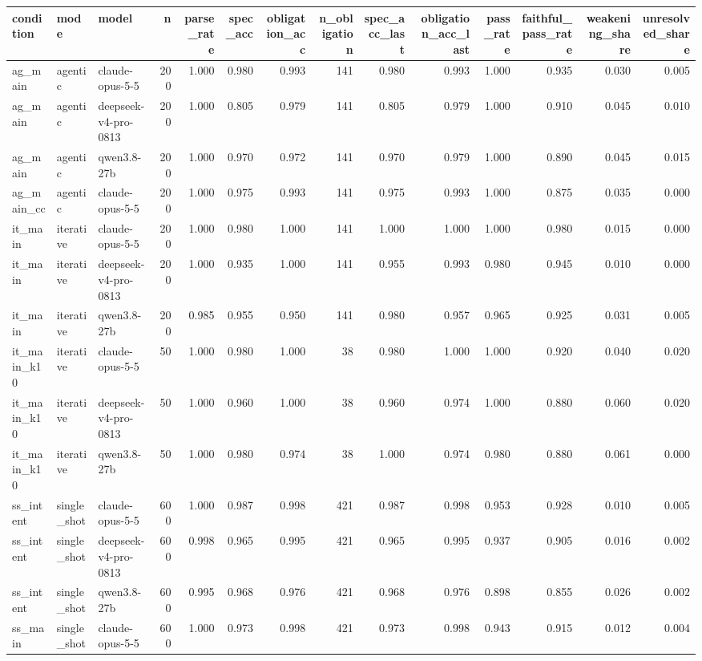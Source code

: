 \begin{tabular}{lllrrrrrrrrrrr}
\toprule
condition & mode & model & n & parse\_rate & spec\_acc & obligation\_acc & n\_obligation & spec\_acc\_last & obligation\_acc\_last & pass\_rate & faithful\_pass\_rate & weakening\_share & unresolved\_share \\
\midrule
ag\_main & agentic & claude-opus-5-5 & 200 & 1.000 & 0.980 & 0.993 & 141 & 0.980 & 0.993 & 1.000 & 0.935 & 0.030 & 0.005 \\
ag\_main & agentic & deepseek-v4-pro-0813 & 200 & 1.000 & 0.805 & 0.979 & 141 & 0.805 & 0.979 & 1.000 & 0.910 & 0.045 & 0.010 \\
ag\_main & agentic & qwen3.8-27b & 200 & 1.000 & 0.970 & 0.972 & 141 & 0.970 & 0.979 & 1.000 & 0.890 & 0.045 & 0.015 \\
ag\_main\_cc & agentic & claude-opus-5-5 & 200 & 1.000 & 0.975 & 0.993 & 141 & 0.975 & 0.993 & 1.000 & 0.875 & 0.035 & 0.000 \\
it\_main & iterative & claude-opus-5-5 & 200 & 1.000 & 0.980 & 1.000 & 141 & 1.000 & 1.000 & 1.000 & 0.980 & 0.015 & 0.000 \\
it\_main & iterative & deepseek-v4-pro-0813 & 200 & 1.000 & 0.935 & 1.000 & 141 & 0.955 & 0.993 & 0.980 & 0.945 & 0.010 & 0.000 \\
it\_main & iterative & qwen3.8-27b & 200 & 0.985 & 0.955 & 0.950 & 141 & 0.980 & 0.957 & 0.965 & 0.925 & 0.031 & 0.005 \\
it\_main\_k10 & iterative & claude-opus-5-5 & 50 & 1.000 & 0.980 & 1.000 & 38 & 0.980 & 1.000 & 1.000 & 0.920 & 0.040 & 0.020 \\
it\_main\_k10 & iterative & deepseek-v4-pro-0813 & 50 & 1.000 & 0.960 & 1.000 & 38 & 0.960 & 0.974 & 1.000 & 0.880 & 0.060 & 0.020 \\
it\_main\_k10 & iterative & qwen3.8-27b & 50 & 1.000 & 0.980 & 0.974 & 38 & 1.000 & 0.974 & 0.980 & 0.880 & 0.061 & 0.000 \\
ss\_intent & single\_shot & claude-opus-5-5 & 600 & 1.000 & 0.987 & 0.998 & 421 & 0.987 & 0.998 & 0.953 & 0.928 & 0.010 & 0.005 \\
ss\_intent & single\_shot & deepseek-v4-pro-0813 & 600 & 0.998 & 0.965 & 0.995 & 421 & 0.965 & 0.995 & 0.937 & 0.905 & 0.016 & 0.002 \\
ss\_intent & single\_shot & qwen3.8-27b & 600 & 0.995 & 0.968 & 0.976 & 421 & 0.968 & 0.976 & 0.898 & 0.855 & 0.026 & 0.002 \\
ss\_main & single\_shot & claude-opus-5-5 & 600 & 1.000 & 0.973 & 0.998 & 421 & 0.973 & 0.998 & 0.943 & 0.915 & 0.012 & 0.004 \\

\end{tabular}
